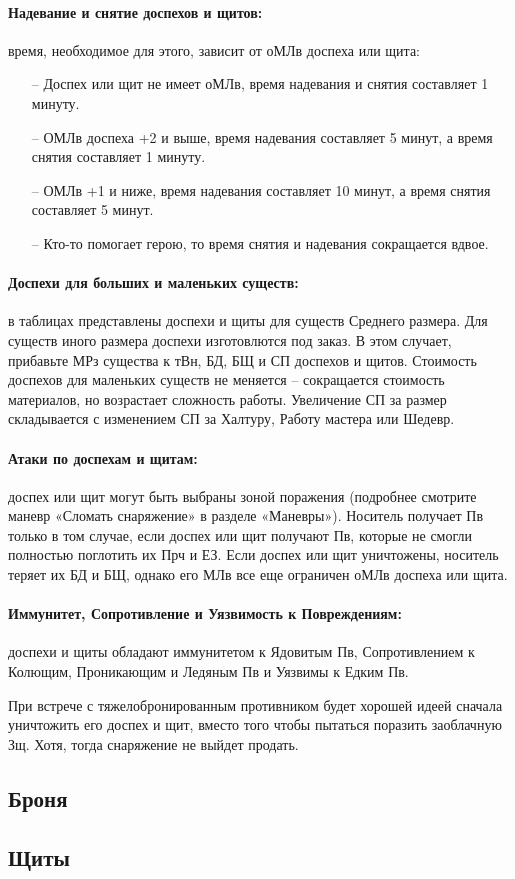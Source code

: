 \paragraph{Надевание и снятие доспехов и щитов:} время, необходимое для этого, зависит от оМЛв доспеха или щита:
\begin{itemize}
    \item[--] Доспех или щит не имеет оМЛв, время надевания и снятия составляет 1 минуту.
    \item[--] ОМЛв доспеха +2 и выше, время надевания составляет 5 минут, а время снятия составляет 1 минуту.
    \item[--] ОМЛв +1 и ниже, время надевания составляет 10 минут, а время снятия составляет 5 минут.
    \item[--] Кто-то помогает герою, то время снятия и надевания сокращается вдвое.
\end{itemize}
\paragraph{Доспехи для больших и маленьких существ:} в таблицах представлены доспехи и щиты для существ Среднего размера. Для существ иного размера доспехи изготовлются под заказ. 
\newline В этом случает, прибавьте МРз существа к тВн, БД, БЩ и СП доспехов и щитов. Стоимость доспехов для маленьких существ не меняется – сокращается стоимость материалов, но возрастает сложность работы. Увеличение СП за размер складывается с изменением СП за Халтуру, Работу мастера или Шедевр.
\paragraph{Атаки по доспехам и щитам:} доспех или щит могут быть выбраны зоной поражения (подробнее смотрите маневр «Сломать снаряжение» в разделе «Маневры»). Носитель получает Пв только в том случае, если доспех или щит получают Пв, которые не смогли полностью поглотить их Прч и ЕЗ.
\newline Если доспех или щит уничтожены, носитель теряет их БД и БЩ, однако его МЛв все еще ограничен оМЛв доспеха или щита.
\paragraph{Иммунитет, Сопротивление и Уязвимость к Повреждениям:} доспехи и щиты обладают иммунитетом к Ядовитым Пв, Сопротивлением к Колющим, Проникающим и Ледяным Пв и Уязвимы к Едким Пв. 
\begin{tcolorbox}
    При встрече с тяжелобронированным противником будет хорошей идеей сначала уничтожить его доспех и щит, вместо того чтобы пытаться поразить заоблачную Зщ. Хотя, тогда снаряжение не выйдет продать. 
\end{tcolorbox}

\subsection{Броня}

\subsection{Щиты}


